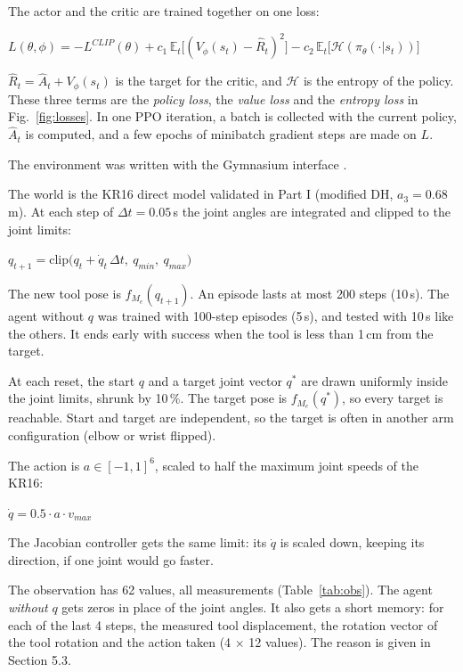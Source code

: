 \documentclass[10pt,a4paper]{article}
\newenvironment{eq}{\vspace{-5pt}\begin{center}$\displaystyle}{$\end{center}\vspace{-6pt}}
\newcommand{\head}[1]{\vspace{4pt}{\large\bfseries #1}\par}
\newcommand{\sub}[1]{\vspace{1pt}{\bfseries #1}\par}
\begin{document}
\sub{2.5 The full loss}
The actor and the critic are trained together on one loss:
\begin{eq}
L(\theta,\phi) = -L^{CLIP}(\theta) + c_1\, \mathbb{E}_t\big[(V_\phi(s_t) - \hat R_t)^2\big] - c_2\, \mathbb{E}_t\big[\mathcal{H}(\pi_\theta(\cdot|s_t))\big]
\end{eq}
$\hat R_t = \hat A_t + V_\phi(s_t)$ is the target for the critic, and $\mathcal{H}$ is the entropy of the policy.
These three terms are the \emph{policy loss}, the \emph{value loss} and the \emph{entropy loss} in Fig.~\ref{fig:losses}.
In one PPO iteration, a batch is collected with the current policy, $\hat A_t$ is computed, and a few epochs of minibatch gradient steps are made on $L$.

\head{3. Environment}
The environment was written with the Gymnasium interface \cite{gym}.

\sub{3.1 The hidden world}
The world is the KR16 direct model validated in Part I (modified DH, $a_3 = 0.68$\,m).
At each step of $\Delta t = 0.05$\,s the joint angles are integrated and clipped to the joint limits:
\begin{eq}
q_{t+1} = \mathrm{clip}\big(q_t + \dot q_t\, \Delta t,\ q_{min},\ q_{max}\big)
\end{eq}
The new tool pose is $f_{M_e}(q_{t+1})$.
An episode lasts at most 200 steps (10\,s). The agent without $q$ was trained with 100-step episodes (5\,s), and tested with 10\,s like the others.
It ends early with success when the tool is less than 1\,cm from the target.

At each reset, the start $q$ and a target joint vector $q^*$ are drawn uniformly inside the joint limits, shrunk by 10\,\%.
The target pose is $f_{M_e}(q^*)$, so every target is reachable.
Start and target are independent, so the target is often in another arm configuration (elbow or wrist flipped).

\sub{3.2 Action}
The action is $a \in [-1,1]^6$, scaled to half the maximum joint speeds of the KR16:
\begin{eq}
\dot q = 0.5 \cdot a \cdot v_{max}
\end{eq}
The Jacobian controller gets the same limit: its $\dot q$ is scaled down, keeping its direction, if one joint would go faster.

\sub{3.3 Observation}
The observation has 62 values, all measurements (Table~\ref{tab:obs}).
The agent \emph{without} $q$ gets zeros in place of the joint angles.
It also gets a short memory: for each of the last 4 steps, the measured tool displacement, the rotation vector of the tool rotation and the action taken (4 $\times$ 12 values).
The reason is given in Section 5.3.
\end{document}
